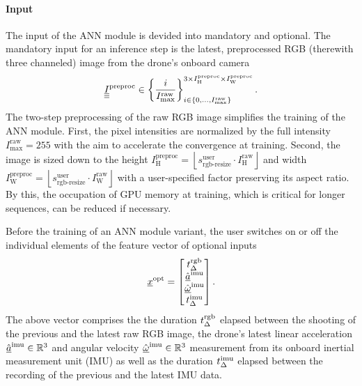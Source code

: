 \paragraph*{Input} ${}$\\
The input of the ANN module is devided into mandatory and optional.
The mandatory input for an inference step is the
latest, preprocessed RGB (therewith three channeled) image from the drone's onboard camera
\begin{equation}
    \underline{\underline{\underline I}}^\text{preproc}
    \in 
    \left\{
        \frac{i}{I_\text{max}^\text{raw}}
    \right\}
    _{
        i \in 
        \left\{
            0,\dots,I_\text{max}^\text{raw}
        \right\}
    }
    ^{
        3 \times
        I_\text{H}^\text{preproc} \times 
        I_\text{W}^\text{preproc}
    }.
\end{equation}
The two-step preprocessing of the raw RGB image simplifies the training of the ANN module.
First, the pixel intensities are normalized by the full intensity 
$I_\text{max}^\text{raw} = 255$
with the aim to accelerate the convergence at training.
Second, the image is sized down 
to the height 
$
    I_\text{H}^\text{preproc} 
    = 
    \left\lfloor
    s^\text{user}_\text{rgb-resize}
    \cdot
    I_\text{H}^\text{raw}
    \right\rfloor
$
and width
$
    I_\text{W}^\text{preproc} 
    = 
    \left\lfloor
    s^\text{user}_\text{rgb-resize}
    \cdot
    I_\text{W}^\text{raw}
    \right\rfloor
$
with a user-specified 
factor preserving its aspect ratio.
By this, the occupation of GPU memory at training,
which is critical for longer sequences,
can be reduced if necessary.



Before the training of an ANN module variant, the user switches on or off
the individual elements of the feature vector of optional inputs
\begin{align}
    \featvec[]{\text{opt}}{}{}{} 
    =
    \begin{bmatrix}
        \dur[]{\text{rgb}}{}{}{} \\
        \acc[\hat]{\text{imu}}{}{}{} \\
        \angvel[\hat]{\text{imu}}{}{}{} \\
        \dur[]{\text{imu}}{}{}{}
    \end{bmatrix}
    .
\end{align}
The above vector comprises the
the duration
$\dur[]{\text{rgb}}{}{}{}$
elapsed between the shooting of the previous and the latest raw RGB image,
the drone's latest linear acceleration
$\acc[\hat]{\text{imu}}{}{}{} \in \mathbb{R}^3$
and angular velocity
$\angvel[\hat]{\text{imu}}{}{}{} \in \mathbb{R}^3$
measurement from its onboard inertial measurement unit (IMU)
as well as the duration
$\dur[]{\text{imu}}{}{}{}$
elapsed between the recording of the previous and the latest IMU data.








